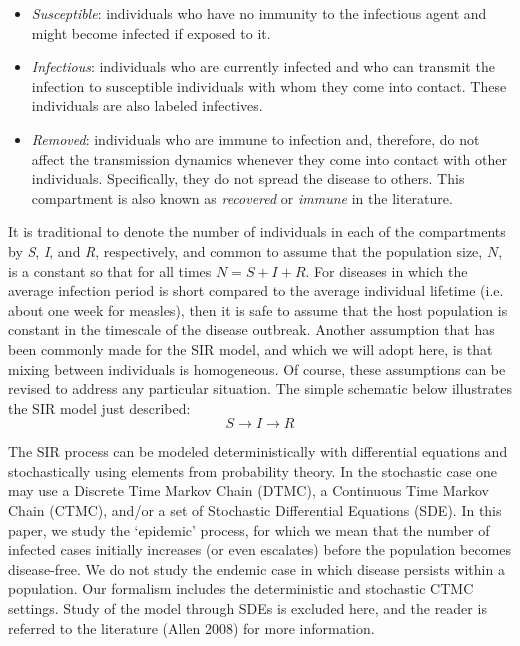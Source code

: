 \documentclass[reqno,11pt]{amsart}
\begin{document}
\begin{itemize}
	\item \textit{Susceptible}: individuals who have no immunity to the infectious agent and might become infected if exposed to it.
	\item \textit{Infectious}: individuals who are currently infected and who can transmit the infection to susceptible individuals with whom they come into contact. These individuals are also labeled infectives.
	\item \textit{Removed}: individuals who are immune to infection and, therefore, do not affect the transmission dynamics whenever they come into contact with other 
		individuals. Specifically, they do not spread the disease to others. This compartment is also known as \textit{recovered} or \textit{immune} in the literature.
\end{itemize}

It is traditional to denote the number of individuals in each of the compartments by \textit{S}, \textit{I}, and \textit{R}, respectively, and common to assume that the population size,
$N$, is a constant so that for all times $N = S+I+R$. For diseases in which the average infection period is short compared to the average individual lifetime (i.e. about one week for measles), then it is safe to assume that the host population is constant in the timescale of the disease outbreak.  Another assumption that has been commonly made for the SIR model, and which we will adopt here, is that mixing between individuals is homogeneous. Of course, these assumptions can be revised to address any particular situation. The simple schematic below illustrates the SIR model just described:
\begin{equation*}
 S \rightarrow  I \rightarrow  R
\end{equation*}


	The SIR process can be modeled deterministically with differential equations and stochastically using elements from probability theory. In the stochastic case one may use a
Discrete Time Markov Chain (DTMC), a Continuous Time Markov Chain (CTMC), and/or a set of Stochastic Differential Equations (SDE). In this paper, we study the `epidemic' process, for which we mean that the number of infected cases initially increases (or even escalates) before the population becomes disease-free. We do not study the endemic case in which disease persists within a population. Our formalism includes the deterministic and stochastic CTMC settings. Study of the model through SDEs is excluded here, and the reader is referred to the literature (Allen 2008) for more information.
\end{document}
